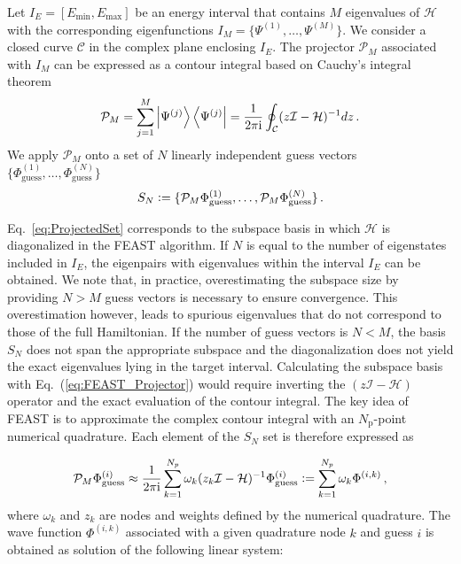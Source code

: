 \documentclass[journal=jctcce]{achemso}
\newcommand{\defeq}{\vcentcolon=}
\newcommand{\opr}[1]{\mathcal{#1}}
\begin{document}
\noindent Let $I_E = [E_\text{min}, E_\text{max}]$ be an energy interval that contains $M$ eigenvalues of $\mathcal{H}$ with the corresponding eigenfunctions $I_M = \{\Psi^{(1)}, \dots,\Psi^{(M)}\}$.
We consider a closed curve $\mathcal{C}$ in the complex plane enclosing $I_E$.
The projector $\mathcal{P}_M$ associated with $I_M$ can be expressed as a contour integral\cite{Polizzi2009_FEAST} based on Cauchy's integral theorem\cite{Galgon2011_FEAST-Review}
%
\begin{equation}
  \mathcal{P}_{M} = \sum_{j=1}^{M} \ket{\Psi^{(j)}} \bra{\Psi^{(j)}}
                    = \frac{1}{2\pi \mathrm{i}} \oint_{\mathcal{C}}
                      (z \opr{I} - \opr{H})^{-1} dz \, .
  \label{eq:FEAST_Projector}
\end{equation}
%
We apply $\mathcal{P}_{M}$ onto a set of $N$ linearly independent guess vectors $\{\Phi_\text{guess}^{(1)}, \ldots, \Phi_\text{guess}^{(N)}\}$ 
%
\begin{equation}
  S_N \defeq 
    \{ \mathcal{P}_{M} \Phi_\text{guess}^{(1)}, \ldots, \mathcal{P}_{M} \Phi_\text{guess}^{(N)} \}\, .
  \label{eq:ProjectedSet}
\end{equation}

\noindent Eq.~\eqref{eq:ProjectedSet} corresponds to the subspace basis in which $\mathcal{H}$ is diagonalized in the FEAST algorithm.
If $N$ is equal to the number of eigenstates included in $I_E$,  the eigenpairs with eigenvalues within the interval $I_E$ can be obtained.
We note that, in practice, overestimating the subspace size by providing $N>M$ guess vectors is necessary to ensure convergence.\cite{Polizzi2009_FEAST}
This overestimation however, leads to spurious eigenvalues that do not correspond to those of the full Hamiltonian.
If the number of guess vectors is $N<M$, the basis $S_N$ does not span the appropriate subspace and the diagonalization does not yield the exact eigenvalues lying in the target interval.
Calculating the subspace basis with Eq.~(\ref{eq:FEAST_Projector}) would require inverting the $(z \opr{I} - \opr{H})$ operator and the exact evaluation of the contour integral.
The key idea of FEAST is to approximate the complex contour integral with an $N_\text{p}$-point numerical quadrature.
Each element of the $S_N$ set is therefore expressed as

\begin{equation}
  \mathcal{P}_{M} \Phi^{(i)}_{\text{guess}}
    \approx \frac{1}{2\pi \mathrm{i} } \sum_{k=1}^{N_p} \omega_k (z_k \opr{I} - \opr{H})^{-1} \Phi^{(i)}_{\text{guess}}
    \defeq \sum_{k=1}^{N_p} \omega_k \Phi^{(i,k)} \, ,
  \label{eq:ProjectorQuadrature}
\end{equation}
%
where $\omega_k$ and $z_k$ are nodes and weights defined by the numerical quadrature.
The wave function $\Phi^{(i,k)}$ associated with a given quadrature node $k$ and guess $i$ is obtained as solution of the following linear system:
\end{document}

